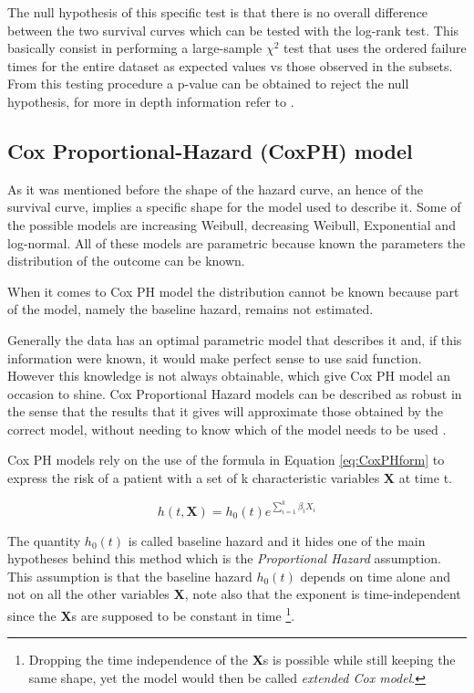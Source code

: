 The null hypothesis of this specific test is that there is no overall difference between the two survival curves \cite{SurvivalAnalysis} which can be tested with the log-rank test.
This basically consist in performing a large-sample $\chi^2$ test that uses the ordered failure times for the entire dataset as expected values vs those observed in the subsets. 
From this testing procedure a p-value can be obtained to reject the null hypothesis, for more in depth information refer to \cite{SurvivalAnalysis}. 

\subsection{Cox Proportional-Hazard (CoxPH) model}
As it was mentioned before the shape of the hazard curve, an hence of the survival curve, implies a specific shape for the model used to describe it.
Some of the possible models are increasing Weibull, decreasing Weibull, Exponential and log-normal.
All of these models are parametric because known the parameters the distribution of the outcome can be known. 

When it comes to Cox PH model the distribution cannot be known because part of the model, namely the baseline hazard, remains not estimated.

Generally the data has an optimal parametric model that describes it and, if this information were known, it would make perfect sense to use said function.
However this knowledge is not always obtainable, which give Cox PH model an occasion to shine.
Cox Proportional Hazard models can be described as robust in the sense that the results that it gives will approximate those obtained by the correct model, without needing to know which of the model needs to be used \cite{SurvivalAnalysis}.
 
Cox PH models rely on the use of the formula in Equation \ref{eq:CoxPHform} to express the risk of a patient with a set of k characteristic variables \textbf{X} at time t.

\begin{equation}\label{eq:CoxPHform}
h(t,\textbf{X}) = h_0(t)e^{\sum_{i=1}^k \beta_i X_i}
\end{equation}

The quantity $h_0(t)$ is called baseline hazard and it hides one of the main hypotheses behind this method which is the \textit{Proportional Hazard} assumption.
This assumption is that the baseline hazard $h_0(t)$ depends on time alone and not on all the other variables \textbf{X}, note also that the exponent is time-independent since the \textbf{X}s are supposed to be constant in time
\footnote{Dropping the time independence of the \textbf{X}s is possible while still keeping the same shape, yet the model would then be called \textit{extended Cox model}.}.

